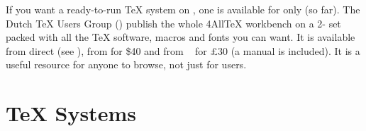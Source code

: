 If you want a ready-to-run \TeX{} system on \CDROM{}, one is available for \MSDOS{}
only (so far). The Dutch \TeX{} Users Group () publish the whole
4All\TeX{} workbench on a 2-\CDROM{} set packed with all the \MSDOS{} \TeX{}
software, 
macros and fonts you can want. It is available from  direct (see
), from  for 
\$40 and from ~ for \pounds30 (a manual is included). It is a useful
resource for anyone to browse, not just for \MSDOS{} users.


\section{\TeX{} Systems}

